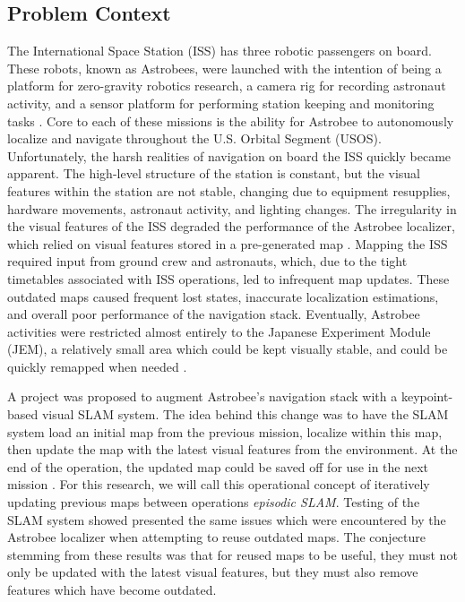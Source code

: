\subsection{Problem Context}


The International Space Station (ISS) has three robotic passengers on board. These robots, known as Astrobees, were launched with the intention of being a platform for zero-gravity robotics research, a camera rig for recording astronaut activity, and a sensor platform for performing station keeping and monitoring tasks \cite{smithASTROBEENEWPLATFORM}. Core to each of these missions is the ability for Astrobee to autonomously localize and navigate throughout the U.S. Orbital Segment (USOS). Unfortunately, the harsh realities of navigation on board the ISS quickly became apparent. The high-level structure of the station is constant, but the visual features within the station are not stable, changing due to equipment resupplies, hardware movements, astronaut activity, and lighting changes. The irregularity in the visual features of the ISS degraded the performance of the Astrobee localizer, which relied on visual features stored in a pre-generated map \cite{soussanAstroLocEfficientRobust2022}. Mapping the ISS required input from ground crew and astronauts, which, due to the tight timetables associated with ISS operations, led to infrequent map updates. These outdated maps caused frequent lost states, inaccurate localization estimations, and overall poor performance of the navigation stack. Eventually, Astrobee activities were restricted almost entirely to the Japanese Experiment Module (JEM), a relatively small area which could be kept visually stable, and could be quickly remapped when needed \cite{carlinoLessonsLearnedAstrobee}.

A project was proposed to augment Astrobee's navigation stack with a keypoint-based visual SLAM system. The idea behind this change was to have the SLAM system load an initial map from the previous mission, localize within this map, then update the map with the latest visual features from the environment. At the end of the operation, the updated map could be saved off for use in the next mission \cite{zuralesCollaborativeSensingMapping2024}. For this research, we will call this operational concept of iteratively updating previous maps between operations \textit{episodic SLAM}. Testing of the SLAM system showed presented the same issues which were encountered by the Astrobee localizer when attempting to reuse outdated maps. The conjecture stemming from these results was that for reused maps to be useful, they must not only be updated with the latest visual features, but they must also remove features which have become outdated.

